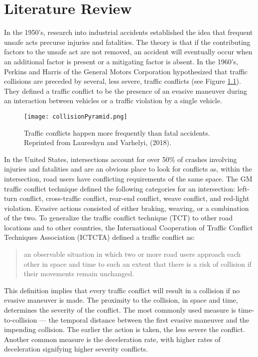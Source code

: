 \documentclass[twoside,symmetric,notoc]{tufte-book}
\begin{document}
\chapter{Literature Review}
\par{%
In the 1950's, research into industrial accidents established the idea that frequent unsafe acts precurse injuries and fatalities.\cite{Heinrich} The theory is that if the contributing factors to the unsafe act are not removed, an accident will eventually occur when an additional factor is present or a mitigating factor is absent. In the 1960's, Perkins and Harris\cite{Perkins} of the General Motors Corporation hypothesized that traffic collisions are preceded by several, less severe, traffic conflicts (see Figure \ref{fig:hyden}). They defined a traffic conflict to be the presence of an evasive maneuver during an interaction between vehicles or a traffic violation by a single vehicle.
}
\begin{figure}
	\centering
	\texttt{[image: collisionPyramid.png]}
	\caption[Traffic conflicts happen more frequently than fatal accidents.]{Traffic conflicts happen more frequently than fatal accidents. Reprinted from  Laureshyn and Varhelyi, (2018).}
	\label{fig:hyden}
\end{figure}
\par{%
In the United States, intersections account for over 50\% of crashes involving injuries and fatalities\cite{FHWA} and are an obvious place to look for conflicts as, within the intersection, road users have conflicting requirements of the same space. The GM traffic conflict technique defined the following categories for an intersection: left-turn conflict, cross-traffic conflict, rear-end conflict, weave conflict, and red-light violation. Evasive actions consisted of either braking, weaving, or a combination of the two. To generalize the traffic conflict technique (TCT) to other road locations and to other countries, the International Cooperation of Traffic Conflict Techniques Association (ICTCTA) defined a traffic conflict as:
\begin{quotation}
an observable situation in which two or more road users approach each other in space and time to such an extent that there is a risk of collision if their movements remain unchanged.\cite{Amundsen}
\end{quotation}
This definition implies that every traffic conflict will result in a collision if no evasive maneuver is made. The proximity to the collision, in space and time, determines the severity of the conflict. The most commonly used measure is time-to-collision --- the temporal distance between the first evasive maneuver and the impending collision. The earlier the action is taken, the less severe the conflict.\cite{Laureshyn} Another common measure is the deceleration rate, with higher rates of deceleration signifying higher severity conflicts.\cite{Johnsson}
}
\end{document}
